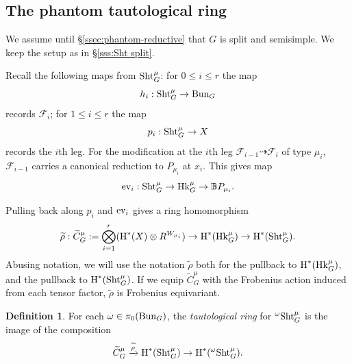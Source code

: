 \documentclass[reqno]{amsart}
\numberwithin{equation}{subsection}
\theoremstyle{definition}
\newtheorem{defn}[subsubsection]{Definition}
\def\BB{\mathbb{B}}
\newcommand\cF{\mathcal{F}}
\newcommand{\Bun}{\textup{Bun}}
\newcommand\ev{\textup{ev}}
\newcommand\Hk{\mathrm{Hk}}
\newcommand\Sht{\textup{Sht}}
\newcommand{\wt}[1]{\widetilde{#1}}
\newcommand\ot{\otimes}
\newcommand{\cohog}[2]{\textup{H}^{#1}({#2})}     %
\newcommand\xr{\xrightarrow}
\renewcommand\r\rho
\renewcommand{\l}{\lambda}
\newcommand{\om}{\omega}
\newcommand\Yun[1]{{\color{red} Y:#1}}
\begin{document}
\subsection{The phantom tautological ring}\label{ssec:taut-ring} We assume until \S \ref{ssec:phantom-reductive} that $G$ is split and semisimple. We keep the setup as in \S \ref{sss:Sht split}. 


Recall the following maps from $\Sht^\mu_G$: for $0\le i\le r$ the map
\begin{equation*}
    h_i: \Sht^\mu_G\to \Bun_G
\end{equation*}
records $\cF_i$; for $1\le i\le r$ the map
\begin{equation*}
    p_i: \Sht^\mu_G\to X
\end{equation*}
records the $i$th leg. For the modification at the $i$th leg $\cF_{i-1}\dashrightarrow \cF_i$ of type $\mu_i$, $\cF_{i-1}$ carries a canonical reduction to $P_{\mu_i}$ at $x_i$. This gives map
\begin{equation*}
    \ev_{i}: \Sht^\mu_G\to \Hk^\mu_G \to \BB P_{\mu_i}.
\end{equation*}

Pulling back along $p_i$ and $\ev_i$ gives a ring homomorphism
\begin{equation}\label{taut hom}
    \wt\rho:\wt C^\mu_G:=\bigotimes_{i=1}^r(\cohog{*}{X}\ot R^{W_{\mu_i}})\to \cohog{*}{\Hk^\mu_G} \to \cohog{*}{\Sht^\mu_G}.
\end{equation}
Abusing notation, we will use the notation $\wt \rho$ both for the pullback to $\cohog{*}{\Hk^\mu_G}$, and the pullback to $\cohog{*}{\Sht^\mu_G}$. If we equip $\wt C^\mu_G$ with the Frobenius action induced from each tensor factor, $\wt\r$ is Frobenius equivariant. 

\begin{defn}
    For each $\om\in \pi_0(\Bun_G)$, the {\em tautological ring} for ${}^\om\Sht^\mu_G$ is the image of the composition
    \begin{equation*}
        \wt C^\mu_G\xr{\wt\rho}\cohog{*}{\Sht^\mu_G}\to \cohog{*}{{}^\om\Sht^\mu_G}.
    \end{equation*}
\end{defn}
\end{document}
